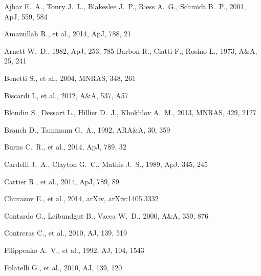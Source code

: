\begin{thebibliography}{99}
Ajhar E.~A., Tonry J.~L., Blakeslee J.~P., Riess A.~G., Schmidt B.~P., 
2001, ApJ, 559, 584 

 Amanullah R., et al., 2014, ApJ, 788, 21

 Arnett 
W.~D., 1982, ApJ, 253, 785 
 Barbon R., Ciatti F., Rosino L., 1973, A\&A, 25, 241


 Benetti S., et al., 2004, MNRAS, 348, 261


 Biscardi I., et al., 2012, A\&A, 537, A57 

 Blondin S., Dessart L., Hillier D.~J., 
Khokhlov A.~M., 2013, MNRAS, 429, 2127 

 Branch D., Tammann G.~A., 1992, ARA\&A, 30, 359 


 Burns
C.~R., et al., 2014, ApJ, 789, 32 

 Cardelli J.~A., Clayton G.~C.,
Mathis J.~S., 1989, ApJ, 345, 245 

 Cartier R., et al., 2014, ApJ, 789, 89

 Churazov E., et al., 2014, arXiv, 
arXiv:1405.3332 

 Contardo G., Leibundgut B., Vacca W.~D., 2000, A\&A, 359, 876 

 Contreras C., et al., 2010, AJ, 139, 519 

 Filippenko A.~V., et al., 1992, AJ, 104,
1543 

 Folatelli G., et al., 2010, AJ, 139, 120 


\end{thebibliography}
